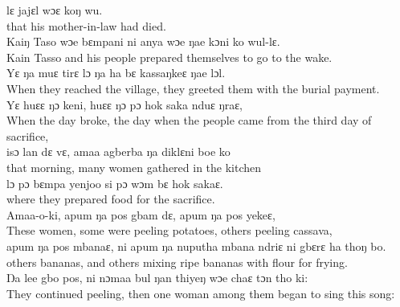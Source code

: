 lɛ jajɛl wɔɛ koŋ wu.\\
that his mother-in-law had died.\\

Kaiŋ Taso wɔe bɛmpani ni anya wɔe ŋae kɔni ko wul-lɛ.\\
Kain Tasso and his people prepared themselves to go to the wake.\\

Yɛ ŋa muɛ tirɛ lɔ ŋa ha bɛ kassaŋkeɛ ŋae lɔl.\\
When they reached the village, they greeted them with the burial payment.\\

Yɛ huɛɛ ŋɔ keni, huɛɛ ŋɔ pɔ hok saka nduɛ ŋraɛ,\\
When the day broke, the day when the people came from the third day of sacrifice,\\

isɔ lan dɛ vɛ, amaa agberba ŋa diklɛni boe ko\\
that morning, many women gathered in the kitchen\\

 lɔ pɔ bɛmpa yenjoo si pɔ wɔm bɛ hok sakaɛ.\\
 where they prepared food for the sacrifice.\\
 
Amaa-o-ki, apum ŋa pos gbam dɛ, apum ŋa pos yekeɛ,\\
These women, some were peeling potatoes, others peeling cassava,\\

apum ŋa pos mbanaɛ, ni apum ŋa nuputha mbana ndriɛ ni gbɛrɛ ha thoŋ bo.\\
others bananas, and others mixing ripe bananas with flour for frying.\\

Ŋa lee gbo pos, ni nɔmaa bul ŋan thiyeŋ wɔe chaɛ tɔn tho ki:\\
They continued peeling, then one woman among them began to sing this song:\\

